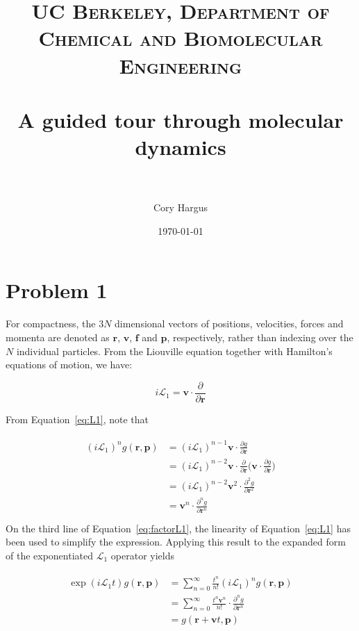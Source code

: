 \documentclass[paper=a4, fontsize=11pt]{scrartcl} %
\title{ \normalfont \normalsize \textsc{UC Berkeley, Department of Chemical
and Biomolecular Engineering} \\ [25pt] %
\horrule{0.5pt} \\[0.4cm] %
\Large A guided tour through molecular dynamics \\ %
\horrule{2pt} \\[0.5cm] %
}
\author{Cory Hargus} %
\date{\normalsize\today} %
\numberwithin{equation}{section} %
\numberwithin{figure}{section} %
\numberwithin{table}{section} %
\newcommand{\LOne}{\mathcal{L}_1}
\begin{document}
\maketitle %


\section{Problem 1}

For compactness, the $3N$ dimensional vectors of positions, velocities, forces and momenta are denoted as $\mathbf{r}$, $\mathbf{v}$, $\mathbf{f}$ and $\mathbf{p}$, respectively, rather than indexing over the $N$ individual particles. From the Liouville equation together with Hamilton's equations of motion, we have:

\begin{equation} \label{eq:L1}
    i \LOne = \mathbf{v} \cdot \frac{\partial}{\partial \mathbf{r}}
\end{equation}

From Equation~\ref{eq:L1}, note that

\begin{align} \label{eq:factorL1}
\begin{split}
    (i \LOne)^n g(\mathbf{r}, \mathbf{p}) &= (i \LOne)^{n-1} \mathbf{v} \cdot \frac{\partial g}{\partial \mathbf{r}} \\
                                       &= (i \LOne)^{n-2} \mathbf{v} \cdot \frac{\partial}{\partial \mathbf{r}} \bigg( \mathbf{v} \cdot \frac{\partial g}{\partial \mathbf{r}}\bigg)\\
                                       &= (i \LOne)^{n-2} \mathbf{v}^2 \cdot \frac{\partial^2 g}{\partial \mathbf{r}^2}\\
                                       &= \mathbf{v}^n \cdot \frac{\partial^n g}{\partial \mathbf{r}^n}\\
\end{split}
\end{align}
On the third line of Equation~\ref{eq:factorL1}, the linearity of Equation~\ref{eq:L1} has been used to simplify the expression. Applying this result to the expanded form of the exponentiated $\LOne$ operator yields

\begin{align} \label{eq:expL1}
\begin{split}
        \exp{(i \LOne t)} g(\mathbf{r}, \mathbf{p}) &= \sum_{n=0}^{\infty}\frac{t^n}{n!} (i \LOne)^n g(\mathbf{r}, \mathbf{p}) \\
                                                                            &= \sum_{n=0}^{\infty}\frac{t^n \mathbf{v}^n}{n!} \cdot \frac{\partial^n g}{\partial \mathbf{r}^n} \\
                                                                            &= g(\mathbf{r} + \mathbf{v}t, \mathbf{p})
\end{split}
\end{align}
\end{document}
